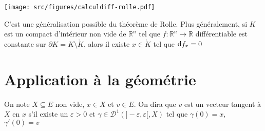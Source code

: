\begin{center}
    \texttt{[image: src/figures/calculdiff-rolle.pdf]}
\end{center}

\begin{rem}
    C'est une généralisation possible du théorème de Rolle. Plus généralement, si $K$ est un compact d'intérieur non vide de $\mathbb R^n$ tel que $f:\mathbb R^n\to\mathbb R$ différentiable est constante sur $\partial K=K\setminus \mathring K$, alors il existe $x\in\mathring K$ tel que $\mathrm{d} f_x=0$
\end{rem}

\section{Application à la géométrie}

\begin{dfn}
    On note $X\subseteq E$ non vide, $x\in X$ et $v\in E$. On dira que $v$ est un vecteur tangent à $X$ en $x$ s'il existe un $\varepsilon>0$ et $\gamma\in\mathcal D^1(]-\varepsilon, \varepsilon[, X)$ tel que $\gamma (0)=x$, $\gamma'(0)=v$
\end{dfn}

